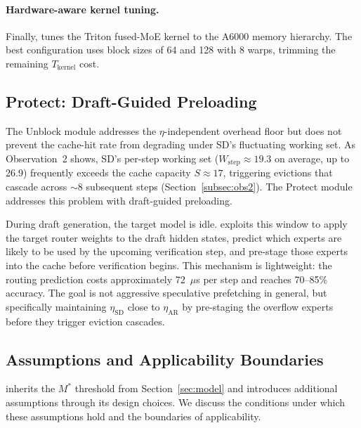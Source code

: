 \paragraph{Hardware-aware kernel tuning.}
Finally, \sysname tunes the Triton fused-MoE kernel to the A6000 memory hierarchy. The best configuration uses block sizes of 64 and 128 with 8 warps, trimming the remaining $T_{\mathrm{kernel}}$ cost.

\subsection{Protect: Draft-Guided Preloading}

The Unblock module addresses the $\eta$-independent overhead floor but does not prevent the cache-hit rate from degrading under SD's fluctuating working set. As Observation~2 shows, SD's per-step working set ($W_{\mathrm{step}} \approx 19.3$ on average, up to 26.9) frequently exceeds the cache capacity $S \approx 17$, triggering evictions that cascade across ${\sim}8$ subsequent steps (Section~\ref{subsec:obs2}). The Protect module addresses this problem with draft-guided preloading.

During draft generation, the target model is idle. \sysname exploits this window to apply the target router weights to the draft hidden states, predict which experts are likely to be used by the upcoming verification step, and pre-stage those experts into the cache before verification begins. This mechanism is lightweight: the routing prediction costs approximately 72~$\mu$s per step and reaches 70--85\% accuracy. The goal is not aggressive speculative prefetching in general, but specifically maintaining $\eta_{\mathrm{SD}}$ close to $\eta_{\mathrm{AR}}$ by pre-staging the overflow experts before they trigger eviction cascades.

\subsection{Assumptions and Applicability Boundaries}
\label{sec:assumptions}

\sysname inherits the $M^*$ threshold from Section~\ref{sec:model} and introduces additional assumptions through its design choices. We discuss the conditions under which these assumptions hold and the boundaries of applicability.

